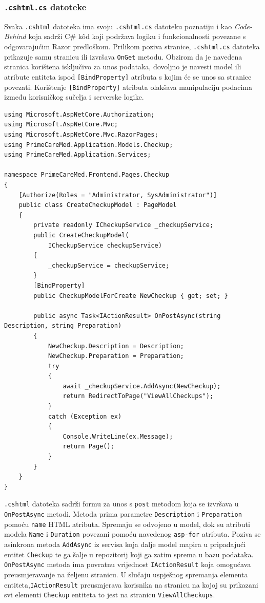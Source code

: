 \subsubsection{\texttt{.cshtml.cs} datoteke}
\label{subsubsec:.cshtml.cs}
Svaka \texttt{.cshtml} datoteka ima svoju \texttt{.cshtml.cs} datoteku poznatiju i kao \textit{Code-Behind} koja sadrži C\# k\^od koji podržava logiku i funkcionalnosti povezane s odgovarajućim Razor predloškom. Prilikom poziva stranice, \texttt{.cshtml.cs} datoteka prikazuje samu stranicu ili izvršava \texttt{OnGet} metodu. Obzirom da je navedena stranica korištena isključivo za unos podataka, dovoljno je navesti model ili atribute entiteta ispod \texttt{[BindProperty]} atributa s kojim će se unos sa stranice povezati. Korištenje \texttt{[BindProperty]} atributa olakšava manipulaciju podacima između korisničkog sučelja i serverske logike.

\begin{lstlisting}[caption={\texttt{CreateCheckup.cshtml.cs} datoteka}, label=createCheckupCs]
using Microsoft.AspNetCore.Authorization;
using Microsoft.AspNetCore.Mvc;
using Microsoft.AspNetCore.Mvc.RazorPages;
using PrimeCareMed.Application.Models.Checkup;
using PrimeCareMed.Application.Services;

namespace PrimeCareMed.Frontend.Pages.Checkup
{
    [Authorize(Roles = "Administrator, SysAdministrator")]
    public class CreateCheckupModel : PageModel
    {
        private readonly ICheckupService _checkupService;
        public CreateCheckupModel(
            ICheckupService checkupService)
        {
            _checkupService = checkupService;
        }
        [BindProperty]
        public CheckupModelForCreate NewCheckup { get; set; }

        public async Task<IActionResult> OnPostAsync(string Description, string Preparation)
        {
            NewCheckup.Description = Description;
            NewCheckup.Preparation = Preparation;
            try
            {
                await _checkupService.AddAsync(NewCheckup);
                return RedirectToPage("ViewAllCheckups");
            }
            catch (Exception ex)
            {
                Console.WriteLine(ex.Message);
                return Page();
            }   
        }
    }
}
\end{lstlisting}

\texttt{.cshtml} datoteka sadrži formu za unos s \texttt{post} metodom koja se izvršava u \\\texttt{OnPostAsync} metodi. Metoda prima parametre \texttt{Description} i \texttt{Preparation} pomoću \texttt{name} HTML atributa. Spremaju se odvojeno u model, dok su atributi modela \texttt{Name} i \texttt{Duration} povezani pomoću navedenog \texttt{asp-for} atributa. Poziva se asinkrona metoda \texttt{AddAsync} iz servisa koja dalje model mapira u pripadajući entitet \texttt{Checkup} te ga šalje u repozitorij koji ga zatim sprema u bazu podataka. \texttt{OnPostAsync} metoda ima povratnu vrijednost \texttt{IActionResult} koja omogućava preusmjeravanje na željenu stranicu. U slučaju uspješnog spremanja elementa entiteta,\texttt{IActionResult} preusmjerava korisnika na stranicu na kojoj su prikazani svi elementi \texttt{Checkup} entiteta to jest na stranicu \texttt{ViewAllCheckups}.

